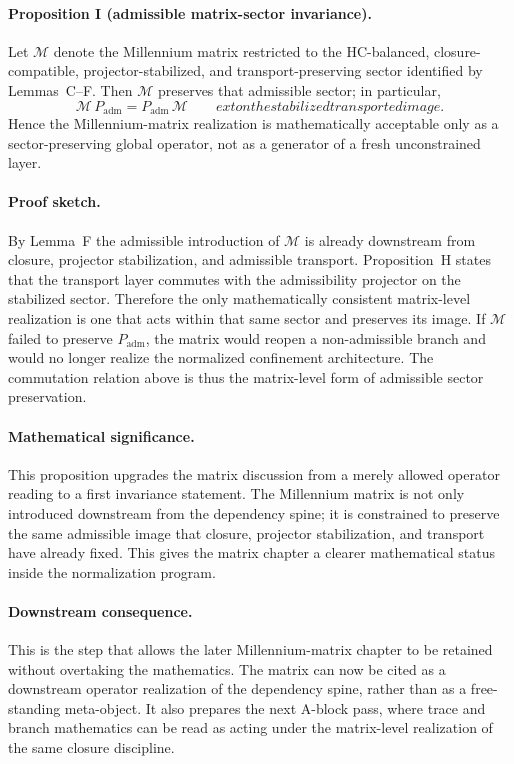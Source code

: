 \paragraph{Proposition I (admissible matrix-sector invariance).}
Let $\mathcal M$ denote the Millennium matrix restricted to the HC-balanced,
closure-compatible, projector-stabilized, and transport-preserving sector
identified by Lemmas~C--F. Then $\mathcal M$ preserves that admissible sector;
in particular,
\[
\mathcal M\,P_{\mathrm{adm}} = P_{\mathrm{adm}}\,\mathcal M
\qquad	ext{on the stabilized transported image.}
\]
Hence the Millennium-matrix realization is mathematically acceptable only as a
sector-preserving global operator, not as a generator of a fresh unconstrained
layer.

\paragraph{Proof sketch.}
By Lemma~F the admissible introduction of $\mathcal M$ is already downstream
from closure, projector stabilization, and admissible transport. Proposition~H
states that the transport layer commutes with the admissibility projector on the
stabilized sector. Therefore the only mathematically consistent matrix-level
realization is one that acts within that same sector and preserves its image.
If $\mathcal M$ failed to preserve $P_{\mathrm{adm}}$, the matrix would reopen a
non-admissible branch and would no longer realize the normalized confinement
architecture. The commutation relation above is thus the matrix-level form of
admissible sector preservation.

\paragraph{Mathematical significance.}
This proposition upgrades the matrix discussion from a merely allowed operator
reading to a first invariance statement. The Millennium matrix is not only
introduced downstream from the dependency spine; it is constrained to preserve
the same admissible image that closure, projector stabilization, and transport
have already fixed. This gives the matrix chapter a clearer mathematical status
inside the normalization program.

\paragraph{Downstream consequence.}
This is the step that allows the later Millennium-matrix chapter to be retained
without overtaking the mathematics. The matrix can now be cited as a downstream
operator realization of the dependency spine, rather than as a free-standing
meta-object. It also prepares the next A-block pass, where trace and branch
mathematics can be read as acting under the matrix-level realization of the same
closure discipline.

